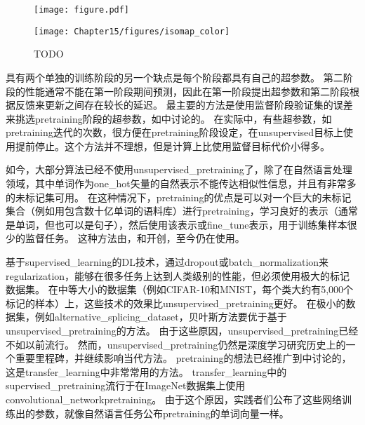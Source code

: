 
\begin{figure}[!htb]
\ifOpenSource
\centerline{\texttt{[image: figure.pdf]}}
\else
\centerline{\texttt{[image: Chapter15/figures/isomap\_color]}}
\fi
\caption{TODO}
\label{fig:chap15_isomap}
\end{figure}


具有两个单独的训练阶段的另一个缺点是每个阶段都具有自己的超参数。
第二阶段的性能通常不能在第一阶段期间预测，因此在第一阶段提出超参数和第二阶段根据反馈来更新之间存在较长的延迟。
最主要的方法是使用监督阶段验证集的误差来挑选\gls{pretraining}阶段的超参数，如\cite{Larochelle-jmlr-2009}中讨论的。
在实际中，有些超参数，如\gls{pretraining}迭代的次数，很方便在\gls{pretraining}阶段设定，在\gls{unsupervised}目标上使用提前停止。这个方法并不理想，但是计算上比使用监督目标代价小得多。


如今，大部分算法已经不使用\gls{unsupervised_pretraining}了，除了在自然语言处理领域，其中单词作为\gls{one_hot}矢量的自然表示不能传达相似性信息，并且有非常多的未标记集可用。
在这种情况下，\gls{pretraining}的优点是可以对一个巨大的未标记集合（例如用包含数十亿单词的语料库）进行\gls{pretraining}，学习良好的表示（通常是单词，但也可以是句子），然后使用该表示或\gls{fine_tune}表示，用于训练集样本很少的监督任务。
这种方法由\cite{CollobertR2008-small}，\cite{Turian+Ratinov+Bengio-2010-small}和\cite{collobert2011natural}开创，至今仍在使用。


基于\gls{supervised_learning}的\gls{DL}技术，通过\gls{dropout}或\gls{batch_normalization}来\gls{regularization}，能够在很多任务上达到人类级别的性能，但必须使用极大的标记数据集。
在中等大小的数据集（例如CIFAR-10和MNIST，每个类大约有5,000个标记的样本）上，这些技术的效果比\gls{unsupervised_pretraining}更好。
在极小的数据集，例如\gls{alternative_splicing_dataset}，贝叶斯方法要优于基于\gls{unsupervised_pretraining}的方法\citep{Srivastava-master-small}。
由于这些原因，\gls{unsupervised_pretraining}已经不如以前流行。
然而，\gls{unsupervised_pretraining}仍然是深度学习研究历史上的一个重要里程碑，并继续影响当代方法。
\gls{pretraining}的想法已经推广到中讨论的，这是\gls{transfer_learning}中非常常用的方法。
\gls{transfer_learning}中的\gls{supervised_pretraining}流行\citep{Oquab-et-al-CVPR2014,yosinski-nips2014}于在ImageNet数据集上使用\gls{convolutional_network}\gls{pretraining}。
由于这个原因，实践者们公布了这些网络训练出的参数，就像自然语言任务公布\gls{pretraining}的单词向量一样\citep{collobert2011natural,Mikolov-et-al-ICLR2013}。

